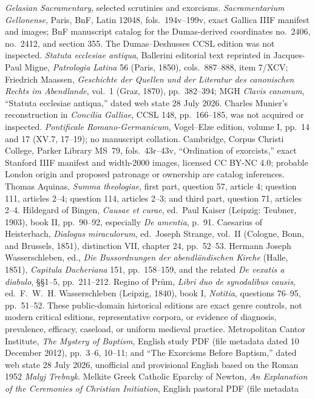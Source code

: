 \emph{Gelasian Sacramentary}, selected scrutinies and exorcisms.
\emph{Sacramentarium Gellonense}, Paris, BnF, Latin 12048, fols.~194v--199v,
exact Gallica IIIF manifest and images; BnF manuscript catalog for the
Dumas-derived coordinates no.~2406, no.~2412, and section 355. The
Dumas--Deshusses CCSL edition was not inspected.
\emph{Statuta ecclesiae antiqua}, Ballerini editorial text reprinted in
Jacques-Paul Migne, \emph{Patrologia Latina} 56 (Paris, 1850), cols.~887--888,
item 7/XCV; Friedrich Maassen, \emph{Geschichte der Quellen und der Literatur
des canonischen Rechts im Abendlande}, vol.~1 (Graz, 1870), pp.~382--394;
MGH \emph{Clavis canonum}, ``Statuta ecclesiae antiqua,'' dated web state
28 July 2026. Charles Munier's reconstruction in \emph{Concilia Galliae},
CCSL 148, pp.~166--185, was not acquired or inspected.
\emph{Pontificale Romano-Germanicum}, Vogel--Elze edition, volume I,
pp.~14 and 17 (XV.7, 17--19); no manuscript collation.
Cambridge, Corpus Christi College, Parker Library MS~79, fols.~43r--43v,
``Ordination of exorcists,'' exact Stanford IIIF manifest and width-2000
images, licensed CC BY-NC 4.0; probable London origin and proposed patronage
or ownership are catalog inferences.
Thomas Aquinas, \emph{Summa theologiae}, first part, question 57, article 4;
question 111, articles 2--4; question 114, articles 2--3; and third part,
question 71, articles 2--4.
Hildegard of Bingen, \emph{Causae et curae}, ed.\ Paul Kaiser (Leipzig:
Teubner, 1903), book II, pp.~90--92, especially \emph{De amentia},
p.~91. Caesarius of Heisterbach, \emph{Dialogus miraculorum}, ed.\ Joseph
Strange, vol.~II (Cologne, Bonn, and Brussels, 1851), distinction VII,
chapter 24, pp.~52--53. Hermann Joseph Wasserschleben, ed.,
\emph{Die Bussordnungen der abendländischen Kirche} (Halle, 1851),
\emph{Capitula Dacheriana} 151, pp.~158--159, and the related
\emph{De vexatis a diabulo}, §§1--5, pp.~211--212. Regino of Prüm,
\emph{Libri duo de synodalibus causis}, ed.\ F.~W.~H. Wasserschleben
(Leipzig, 1840), book I, \emph{Notitia}, questions 76--95, pp.~51--52.
These public-domain historical editions are exact genre controls, not modern
critical editions, representative corpora, or evidence of diagnosis,
prevalence, efficacy, caseload, or uniform medieval practice.
Metropolitan Cantor Institute, \emph{The Mystery of Baptism}, English study
PDF (file metadata dated 10 December 2012), pp.~3--6, 10--11; and
``The Exorcisms Before Baptism,'' dated web state 28 July 2026, unofficial
and provisional English based on the Roman 1952 \emph{Malyj Trebnyk}.
Melkite Greek Catholic Eparchy of Newton, \emph{An Explanation of the
Ceremonies of Christian Initiation}, English pastoral PDF (file metadata
